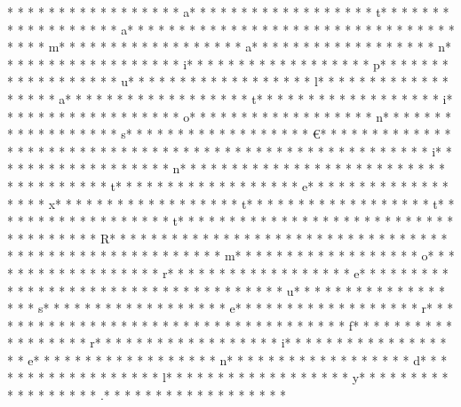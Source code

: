 * *  * * *  * * *  *  * * *  *  * * *  * a* * *  * * *  * * *  *  * * *  *  * * *  * t* * *  * * *  * * *  *  * * *  *  * * *  * a* * *  * * *  * * *  *  * * *  *  * * *  *  * * *  * * *  * * *  *  * * *  *  * * *  * m* * *  * * *  * * *  *  * * *  *  * * *  * a* * *  * * *  * * *  *  * * *  *  * * *  * n* * *  * * *  * * *  *  * * *  *  * * *  * i* * *  * * *  * * *  *  * * *  *  * * *  * p* * *  * * *  * * *  *  * * *  *  * * *  * u* * *  * * *  * * *  *  * * *  *  * * *  * l* * *  * * *  * * *  *  * * *  *  * * *  * a* * *  * * *  * * *  *  * * *  *  * * *  * t* * *  * * *  * * *  *  * * *  *  * * *  * i* * *  * * *  * * *  *  * * *  *  * * *  * o* * *  * * *  * * *  *  * * *  *  * * *  * n* * *  * * *  * * *  *  * * *  *  * * *  * s* * *  * * *  * * *  *  * * *  *  * * *  * €* * *  * * *  * * *  *  * * *  *  * * *  * * * *  * * *  * * *  *  * * *  *  * * *  *  * * *  * * *  * * *  *  * * *  *  * * *  * i* * *  * * *  * * *  *  * * *  *  * * *  * n* * *  * * *  * * *  *  * * *  *  * * *  *  * * *  * * *  * * *  *  * * *  *  * * *  * t* * *  * * *  * * *  *  * * *  *  * * *  * e* * *  * * *  * * *  *  * * *  *  * * *  * x* * *  * * *  * * *  *  * * *  *  * * *  * t* * *  * * *  * * *  *  * * *  *  * * *  * t* * *  * * *  * * *  *  * * *  *  * * *  * t* * *  * * *  * * *  *  * * *  *  * * *  * {* * *  * * *  * * *  *  * * *  *  * * *  * R* * *  * * *  * * *  *  * * *  *  * * *  * }* * *  * * *  * * *  *  * * *  *  * * *  *  * * *  * * *  * * *  *  * * *  *  * * *  * m* * *  * * *  * * *  *  * * *  *  * * *  * o* * *  * * *  * * *  *  * * *  *  * * *  * r* * *  * * *  * * *  *  * * *  *  * * *  * e* * *  * * *  * * *  *  * * *  *  * * *  *  * * *  * * *  * * *  *  * * *  *  * * *  * u* * *  * * *  * * *  *  * * *  *  * * *  * s* * *  * * *  * * *  *  * * *  *  * * *  * e* * *  * * *  * * *  *  * * *  *  * * *  * r* * *  * * *  * * *  *  * * *  *  * * *  *  * * *  * * *  * * *  *  * * *  *  * * *  * f* * *  * * *  * * *  *  * * *  *  * * *  * r* * *  * * *  * * *  *  * * *  *  * * *  * i* * *  * * *  * * *  *  * * *  *  * * *  * e* * *  * * *  * * *  *  * * *  *  * * *  * n* * *  * * *  * * *  *  * * *  *  * * *  * d* * *  * * *  * * *  *  * * *  *  * * *  * l* * *  * * *  * * *  *  * * *  *  * * *  * y* * *  * * *  * * *  *  * * *  *  * * *  * .* * *  * * *  * * *  *  * * *  *  * * *  * 

